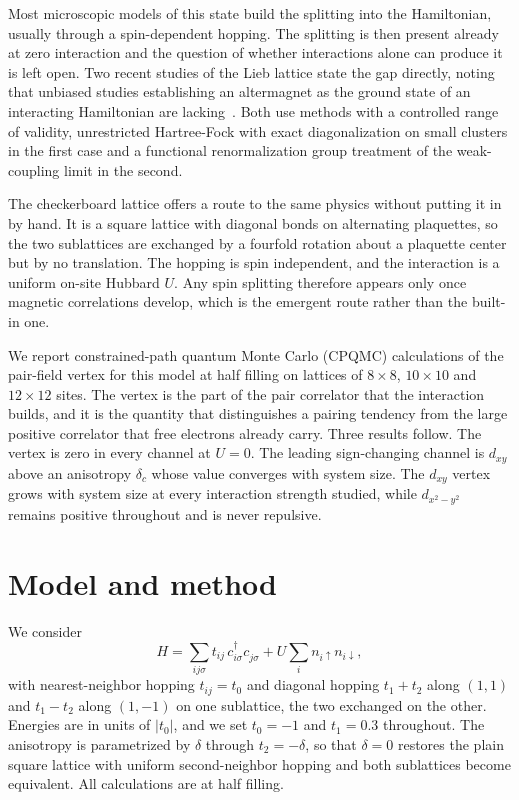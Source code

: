 \documentclass[aps,prb,reprint,superscriptaddress,amsmath,amssymb,floatfix]{revtex4-2}
\begin{document}
Most microscopic models of this state build the splitting into the Hamiltonian,
usually through a spin-dependent hopping. The splitting is then present already
at zero interaction and the question of whether interactions alone can produce
it is left open. Two recent studies of the Lieb lattice state the gap directly,
noting that unbiased studies establishing an altermagnet as the ground state of
an interacting Hamiltonian are lacking~\cite{Kaushal2025,Duerrnagel2025}. Both
use methods with a controlled range of validity, unrestricted Hartree-Fock with
exact diagonalization on small clusters in the first case and a functional
renormalization group treatment of the weak-coupling limit in the second.

The checkerboard lattice offers a route to the same physics without putting it
in by hand. It is a square lattice with diagonal bonds on alternating
plaquettes, so the two sublattices are exchanged by a fourfold rotation about a
plaquette center but by no translation. The hopping is spin independent, and
the interaction is a uniform on-site Hubbard $U$. Any spin splitting therefore
appears only once magnetic correlations develop, which is the emergent route
rather than the built-in one.

We report constrained-path quantum Monte Carlo (CPQMC) calculations of the
pair-field vertex for this model at half filling on lattices of $8\times8$,
$10\times10$ and $12\times12$ sites. The vertex is the part of the pair
correlator that the interaction builds, and it is the quantity that distinguishes
a pairing tendency from the large positive correlator that free electrons already
carry. Three results follow. The vertex is zero in every channel at $U=0$. The
leading sign-changing channel is $d_{xy}$ above an anisotropy $\delta_c$ whose
value converges with system size. The $d_{xy}$ vertex grows with system size at
every interaction strength studied, while $d_{x^2-y^2}$ remains positive
throughout and is never repulsive.


\section{Model and method}

We consider
\begin{equation}
H = \sum_{ij\sigma} t_{ij}\, c^{\dagger}_{i\sigma} c^{\phantom{\dagger}}_{j\sigma}
    + U \sum_i n_{i\uparrow} n_{i\downarrow},
\label{eq:H}
\end{equation}
with nearest-neighbor hopping $t_{ij} = t_0$ and diagonal hopping
$t_1 + t_2$ along $(1,1)$ and $t_1 - t_2$ along $(1,-1)$ on one sublattice, the
two exchanged on the other. Energies are in units of $|t_0|$, and we set
$t_0 = -1$ and $t_1 = 0.3$ throughout. The anisotropy is parametrized by
$\delta$ through $t_2 = -\delta$, so that $\delta = 0$ restores the plain square
lattice with uniform second-neighbor hopping and both sublattices become
equivalent. All calculations are at half filling.
\end{document}
